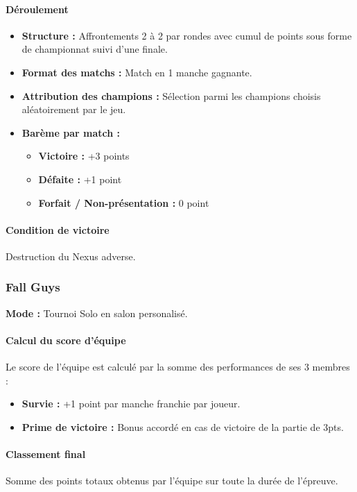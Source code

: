 \documentclass[11pt,a4paper]{article}
\begin{document}
    \paragraph{Déroulement}
    \begin{itemize}
        \item \textbf{Structure :} Affrontements 2 à 2 par rondes avec cumul de points sous forme de championnat suivi d'une finale.
        \item \textbf{Format des matchs :} Match en 1 manche gagnante.
        \item \textbf{Attribution des champions :} Sélection parmi les champions choisis aléatoirement par le jeu.
        \item \textbf{Barème par match :}
        \begin{itemize}
            \item \textbf{Victoire :} +3 points
            \item \textbf{Défaite :} +1 point
            \item \textbf{Forfait / Non-présentation :} 0 point
        \end{itemize}
    \end{itemize}

    \paragraph{Condition de victoire} Destruction du Nexus adverse.

    \subsubsection{Fall Guys}
    \textbf{Mode :} Tournoi Solo en salon personalisé.

    \paragraph{Calcul du score d'équipe}
    Le score de l'équipe est calculé par la somme des performances de ses 3 membres :
    \begin{itemize}
        \item \textbf{Survie :} +1 point par manche franchie par joueur.
        \item \textbf{Prime de victoire :} Bonus accordé en cas de victoire de la partie de 3pts.
    \end{itemize}

    \paragraph{Classement final}
    Somme des points totaux obtenus par l'équipe sur toute la durée de l'épreuve.
\end{document}

